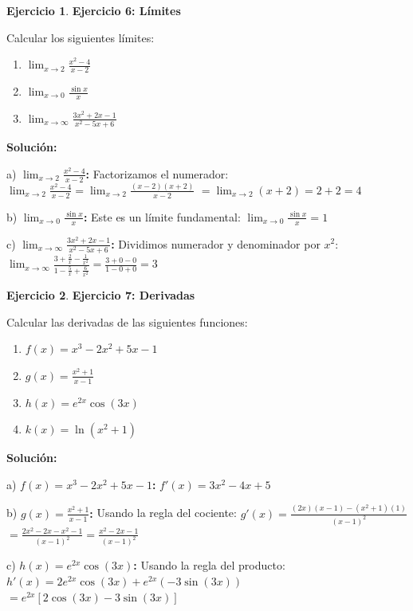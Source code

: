 \documentclass[12pt, a4paper, oneside]{book}
\theoremstyle{definition}
\newtheorem{ejercicio}{Ejercicio}[chapter]
\begin{document}
\begin{ejercicio}
\textbf{Ejercicio 6: Límites}

Calcular los siguientes límites:
\begin{enumerate}[label=\alph*)]
    \item $\lim_{x \to 2} \frac{x^2 - 4}{x - 2}$
    \item $\lim_{x \to 0} \frac{\sin x}{x}$
    \item $\lim_{x \to \infty} \frac{3x^2 + 2x - 1}{x^2 - 5x + 6}$
\end{enumerate}
\end{ejercicio}

\textbf{Solución:}

a) \textbf{$\lim_{x \to 2} \frac{x^2 - 4}{x - 2}$:}
Factorizamos el numerador:
$\lim_{x \to 2} \frac{x^2 - 4}{x - 2} = \lim_{x \to 2} \frac{(x-2)(x+2)}{x - 2}$
$= \lim_{x \to 2} (x + 2) = 2 + 2 = 4$

b) \textbf{$\lim_{x \to 0} \frac{\sin x}{x}$:}
Este es un límite fundamental:
$\lim_{x \to 0} \frac{\sin x}{x} = 1$

c) \textbf{$\lim_{x \to \infty} \frac{3x^2 + 2x - 1}{x^2 - 5x + 6}$:}
Dividimos numerador y denominador por $x^2$:
$\lim_{x \to \infty} \frac{3 + \frac{2}{x} - \frac{1}{x^2}}{1 - \frac{5}{x} + \frac{6}{x^2}} = \frac{3 + 0 - 0}{1 - 0 + 0} = 3$

\begin{ejercicio}
\textbf{Ejercicio 7: Derivadas}

Calcular las derivadas de las siguientes funciones:
\begin{enumerate}[label=\alph*)]
    \item $f(x) = x^3 - 2x^2 + 5x - 1$
    \item $g(x) = \frac{x^2 + 1}{x - 1}$
    \item $h(x) = e^{2x} \cos(3x)$
    \item $k(x) = \ln(x^2 + 1)$
\end{enumerate}
\end{ejercicio}

\textbf{Solución:}

a) \textbf{$f(x) = x^3 - 2x^2 + 5x - 1$:}
$f'(x) = 3x^2 - 4x + 5$

b) \textbf{$g(x) = \frac{x^2 + 1}{x - 1}$:}
Usando la regla del cociente:
$g'(x) = \frac{(2x)(x-1) - (x^2+1)(1)}{(x-1)^2}$
$= \frac{2x^2 - 2x - x^2 - 1}{(x-1)^2} = \frac{x^2 - 2x - 1}{(x-1)^2}$

c) \textbf{$h(x) = e^{2x} \cos(3x)$:}
Usando la regla del producto:
$h'(x) = 2e^{2x} \cos(3x) + e^{2x}(-3\sin(3x))$
$= e^{2x}[2\cos(3x) - 3\sin(3x)]$
\end{document}
